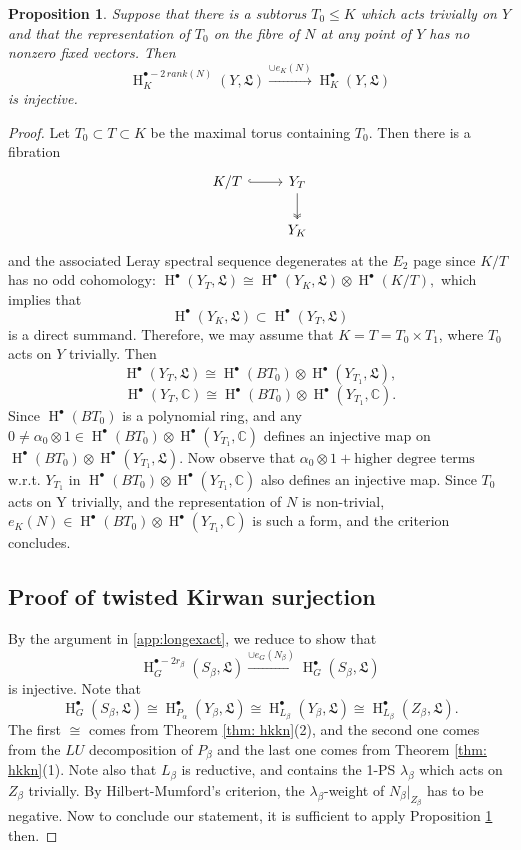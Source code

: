 \documentclass[12pt]{amsart}
\newtheorem{proposition}[theorem]{Proposition}
\theoremstyle{definition}
\theoremstyle{remark}
\numberwithin{equation}{section}
\newcommand{\CC}{\mathbb{C}}
\newcommand{\Hdot}{\operatorname{H}}
\begin{document}
\begin{proposition}\label{prop: atiyah-bott}
Suppose that there is a subtorus $T_0\leq K$ which acts trivially on $Y$ and that the representation of $T_0$ on the fibre of $N$ at any point of $Y$ has no nonzero fixed vectors. Then 
$$\Hdot^{\bullet-2\,rank(N)}_K(Y,\mathfrak{L})\xrightarrow{\cup e_K(N)} \Hdot^{\bullet}_K(Y,\mathfrak{L})$$
is injective. 
\end{proposition}
\begin{proof}
Let $T_0\subset T\subset K$ be the maximal torus containing $T_0$. Then there is a fibration
\[
\begin{tikzcd}
K/T \arrow[r, hook] & Y_T \arrow[d, two heads]\\ & Y_K
\end{tikzcd}
\]
and the associated Leray spectral sequence degenerates at the $E_2$ page since $K/T$ has no odd cohomology:
$\Hdot^{\bullet}(Y_T,\mathfrak{L}
)\cong \Hdot^{\bullet}(Y_K,\mathfrak{L}
)\otimes \Hdot^{\bullet}(K/T),$
which implies that
$$ \Hdot^{\bullet}(Y_K,\mathfrak{L}
)\subset \Hdot^{\bullet}(Y_T,\mathfrak{L}
)$$
is a direct summand. Therefore, we may assume that $K=T=T_0\times T_1$, where $T_0$ acts on $Y$ trivially. Then 
$$\Hdot^{\bullet}(Y_T, \mathfrak{L})\cong \Hdot^{\bullet}(BT_0)\otimes \Hdot^{\bullet}(Y_{T_1}, \mathfrak{L}),$$
$$\Hdot^{\bullet}(Y_T, \CC)\cong \Hdot^{\bullet}(BT_0)\otimes \Hdot^{\bullet}(Y_{T_1}, \CC).$$
Since $\Hdot^{\bullet}(BT_0)$ is a polynomial ring, and any $0\neq \alpha_0\otimes1\in \Hdot^{\bullet}(BT_0)\otimes \Hdot^{\bullet}(Y_{T_1}, \CC)$ defines an injective map on $\Hdot^{\bullet}(BT_0)\otimes \Hdot^{\bullet}(Y_{T_1}, \mathfrak{L})$. 
Now observe that $\alpha_0\otimes 1+\text{higher degree terms}$ w.r.t. $Y_{T_1}$ in $\Hdot^{\bullet}(BT_0)\otimes \Hdot^{\bullet}(Y_{T_1}, \CC)$ also defines an injective map. Since $T_0$ acts on Y trivially, and the representation of $N$ is non-trivial, $e_K(N)\in \Hdot^{\bullet}(BT_0)\otimes \Hdot^{\bullet}(Y_{T_1}, \CC)$ is such a form, and the criterion concludes. 

\subsection{Proof of twisted Kirwan surjection} By the argument in \ref{app:longexact}, we reduce to show that $$\Hdot^{\bullet-2r_{\beta}}_G(S_{\beta},\mathfrak{L})\xrightarrow{\cup e_G(N_{\beta})} \Hdot^{\bullet}_G(S_{\beta},\mathfrak{L})$$
is injective. Note that
$$\Hdot^{\bullet}_{G}(S_{\beta}, \mathfrak{L})\cong \Hdot^{\bullet}_{P_{\alpha}}(Y_{\beta}, \mathfrak{L})\cong \Hdot^{\bullet}_{L_{\beta}}(Y_{\beta}, \mathfrak{L})\cong\Hdot^{\bullet}_{L_{\beta}}(Z_{\beta}, \mathfrak{L}).$$
The first $\cong$ comes from Theorem \ref{thm: hkkn}(2), and the second one comes from the $LU$ decomposition of $P_{\beta}$ and the last one comes from Theorem \ref{thm: hkkn}(1). Note also that $L_{\beta}$ is reductive, and contains the 1-PS $\lambda_{\beta}$ which acts on $Z_{\beta}$ trivially. By Hilbert-Mumford's criterion, the $\lambda_{\beta}$-weight of $N_{\beta}|_{Z_{\beta}}$ has to be negative. Now to conclude our statement, it is sufficient to apply Proposition \ref{prop: atiyah-bott} then. 
\end{proof}



\end{document}

